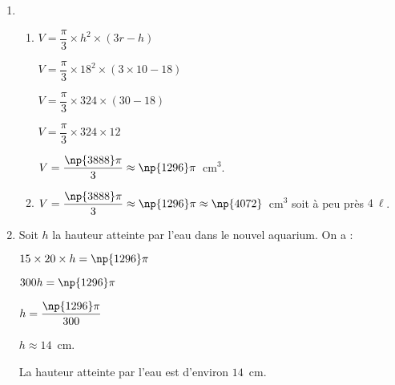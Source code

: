 
\medskip

%
%

\begin{enumerate}
\item %


	\begin{enumerate}
		\item %
$V = \dfrac{\pi}{3} \times  h^2 \times (3r - h)$ 

$V = \dfrac{\pi}{3} \times 18^2 \times(3 \times 10 - 18)$

$V = \dfrac{\pi}{3} \times 324 \times (30 - 18)$

$V = \dfrac{\pi}{3} \times 324 \times 12$

$V = \dfrac{\np{3888}\pi}{3} \approx \np{1296} \pi$~cm$^3$.
		\item %
$V = \dfrac{\np{3888}\pi}{3} \approx \np{1296} \pi \approx \np{4072}$~cm$^3$ soit à peu près $4~\ell$.
	\end{enumerate}
\item %


Soit $h$ la hauteur atteinte par l’eau dans le nouvel aquarium. On a :

$15 \times 20 \times  h = \np{1296}\pi$

$300h = \np{1296}\pi$

$h = \dfrac{\np{1296}\pi}{300}$

$h \approx  14$~cm.

La hauteur atteinte par l’eau est d’environ $14$~cm.
\end{enumerate}
